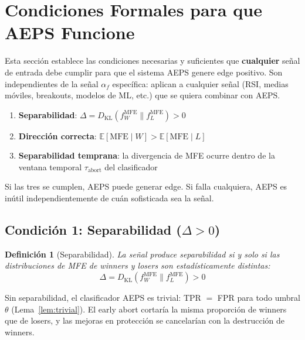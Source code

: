 \documentclass[11pt,a4paper]{article}
\newtheorem{definition}{Definici\'on}[section]
\newcommand{\E}{\mathbb{E}}
\newcommand{\KL}{D_{\mathrm{KL}}}
\newcommand{\af}{\alpha_f}
\begin{document}
\section{Condiciones Formales para que AEPS Funcione}
\label{sec:conditions}

Esta secci\'on establece las condiciones necesarias y suficientes que
\textbf{cualquier} se\~nal de entrada debe cumplir para que el sistema
AEPS genere edge positivo. Son independientes de la se\~nal $\af$
espec\'ifica: aplican a cualquier se\~nal (RSI, medias m\'oviles,
breakouts, modelos de ML, etc.) que se quiera combinar con AEPS.

\begin{tcolorbox}[keybox, title=Las Tres Condiciones de la Se\~nal]
\begin{enumerate}[leftmargin=1.5em]
\item \textbf{Separabilidad}:
  $\Delta = \KL(f_W^{\text{MFE}} \| f_L^{\text{MFE}}) > 0$

\item \textbf{Direcci\'on correcta}:
  $\E[\text{MFE} \mid W] > \E[\text{MFE} \mid L]$

\item \textbf{Separabilidad temprana}:
  la divergencia de MFE ocurre dentro de la ventana temporal
  $\tau_{\text{abort}}$ del clasificador
\end{enumerate}
Si las tres se cumplen, AEPS puede generar edge.
Si falla cualquiera, AEPS es in\'util independientemente de cu\'an
sofisticada sea la se\~nal.
\end{tcolorbox}


\subsection{Condici\'on 1: Separabilidad ($\Delta > 0$)}

\begin{definition}[Separabilidad]
La se\~nal produce separabilidad si y solo si las distribuciones de
MFE de winners y losers son estad\'isticamente distintas:
\begin{equation}
\Delta = \KL(f_W^{\text{MFE}} \| f_L^{\text{MFE}}) > 0
\end{equation}
\end{definition}

Sin separabilidad, el clasificador AEPS es trivial: TPR $=$ FPR
para todo umbral $\theta$ (Lema~\ref{lem:trivial}). El early abort
cortar\'ia la misma proporci\'on de winners que de losers, y las
mejoras en protecci\'on se cancelar\'ian con la destrucci\'on de
winners.
\end{document}
